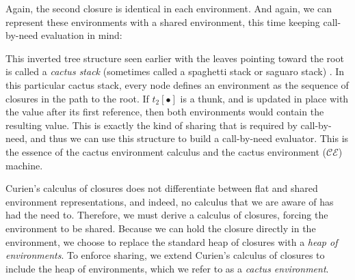 \begin{center}
\end{center}

Again, the second closure is identical in each environment.  And again,
we can represent these environments with a shared environment, this time
keeping call-by-need evaluation in mind:
\begin{center}
\end{center}
This inverted tree structure seen earlier with the leaves pointing toward the
root is called a \emph{cactus stack} (sometimes called a spaghetti stack or
saguaro stack) \cite{hauck1968burroughs,ichbiah1991rationale}. In this
particular cactus stack, every node defines an environment as the sequence of
closures in the path to the root.  If $t_2[\bullet]$ is a thunk, and is updated
in place with the value after its first reference, then both environments would
contain the resulting value. This is exactly the kind of sharing that is
required by call-by-need, and thus we can use this structure to build a
call-by-need evaluator. This is the essence of the cactus environment calculus
and the cactus environment ($\mathcal{CE}$) machine. 

Curien's calculus of closures does not differentiate between flat and shared
environment representations, and indeed, no calculus that we are aware of has
had the need to. Therefore, we must derive a calculus of closures, forcing the
environment to be shared. Because we can hold the closure directly in the
environment, we choose to replace the standard heap of closures with a
\emph{heap of environments}. To enforce sharing, we extend Curien's
calculus of closures to include the heap of environments, which we refer
to as a \emph{cactus environment}. 

